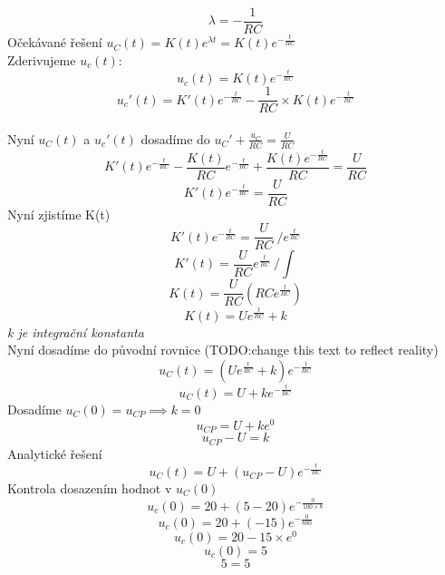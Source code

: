 \documentclass[12pt]{article}
\begin{document}
\[
  \lambda =-\displaystyle\frac{1}{RC}
\]
Očekávané řešení $u_{C}(t)=K(t)e^{\lambda t} = K(t)e^{-\frac{t}{RC}}$\\
Zderivujeme $u_{c}(t)$:
\[
  u_{c}(t) = K(t)e^{-\frac{t}{RC}}
\]
\[
  u_{c}'(t)=K'(t)e^{-\frac{t}{RC}}- \displaystyle\frac{1}{RC} \times K(t)e^{-\frac{t}{RC}}
\]\\
Nyní $u_{C}(t)$ a $u_{c}'(t)$ dosadíme do $u_{C}'+\frac{u_{C}}{RC}=\frac{U}{RC}$
\[
  K'(t)e^{-\frac{t}{RC}}-\displaystyle\frac{K(t)}{RC}e^{-\frac{t}{RC}}+\displaystyle\frac{K(t)e^{-\frac{t}{RC}}}{RC}=\displaystyle\frac{U}{RC}
\]
\[
  K'(t)e^{-\frac{t}{RC}}=\displaystyle\frac{U}{RC}
\]
Nyní zjistíme K(t)
\[
  K'(t)e^{-\frac{t}{RC}}=\displaystyle\frac{U}{RC}\ /e^{\frac{t}{RC}}
\]
\[
  K'(t)=\displaystyle\frac{U}{RC}e^{\frac{t}{RC}}\ /\int{}{}
\]
\[
  K(t)=\displaystyle\frac{U}{RC}(RCe^{\frac{t}{RC}})
\]
\[
  K(t)=Ue^{\frac{t}{RC}}+k
\]
\textit{k je integrační konstanta}\\

Nyní dosadíme do původní rovnice (TODO:change this text to reflect reality)
\[
  u_{C}(t) = (Ue^{\frac{t}{RC}}+k)e^{-\frac{t}{RC}}
\]
\[
  u_{C}(t)=U+ke^{-\frac{t}{RC}}
\]
Dosadíme $u_{C}(0)=u_{CP}\implies k=0$
\[
  u_{CP}=U+ke^{0}
\]
\[
  u_{CP}-U=k
\]
Analytické řešení
\[
  u_{C}(t) = U + (u_{CP}-U)e^{-\frac{t}{RC}}
\]
Kontrola dosazením hodnot v $u_{C}(0)$
\[
  u_{c}(0) = 20 + (5-20)e^{-\frac{0}{100 \times 8}}
\]
\[
  u_{c}(0) = 20 + (-15)e^{-\frac{0}{800}}
\]
\[
  u_{c}(0) = 20 -15 \times e^{0}
\]
\[
  u_{c}(0) = 5 
\]
\[
  5=5
\]
\end{document}
